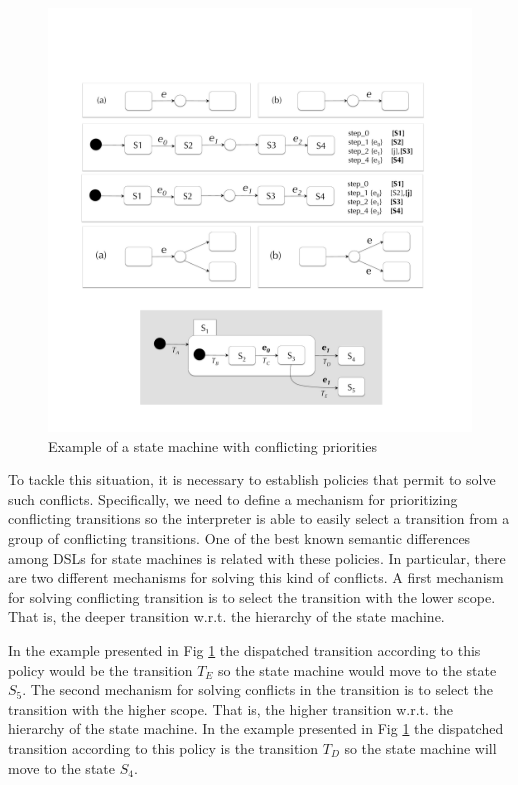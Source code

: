\begin{figure}[h!]
  \centering
  \includegraphics[width=1\linewidth]{images/conflicting-priorities.pdf}
  \caption{Example of a state machine with conflicting priorities}
  \label{fig:conflicting-priorities}
\end{figure}

To tackle this situation, it is necessary to establish policies that permit to solve such conflicts. Specifically, we need to define a mechanism for prioritizing conflicting transitions so the interpreter is able to easily select a transition from a group of conflicting transitions. One of the best known semantic differences among DSLs for state machines is related with these policies. In particular, there are two different mechanisms for solving this kind of conflicts. A first mechanism for solving conflicting transition is to select the transition with the lower scope. That is, the deeper transition w.r.t. the hierarchy of the state machine.

In the example presented in Fig \ref{fig:conflicting-priorities} the dispatched transition according to this policy would be the transition $T_E$ so the state machine would move to the state $S_5$. The second mechanism for solving conflicts in the transition is to select the transition with the higher scope. That is, the higher transition w.r.t. the hierarchy of the state machine. In the example presented in Fig \ref{fig:conflicting-priorities} the dispatched transition according to this policy is the transition $T_D$ so the state machine will move to the state $S_4$.

